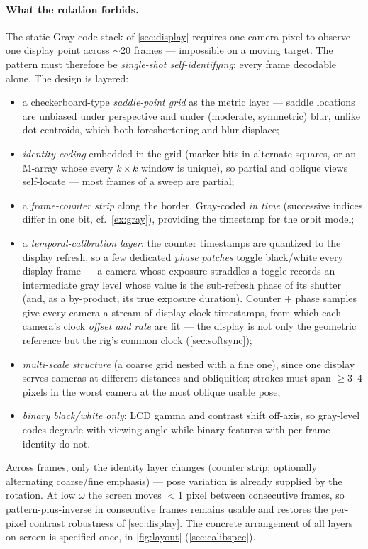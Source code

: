 \documentclass[11pt]{article}
\theoremstyle{definition}
\begin{document}
\paragraph{What the rotation forbids.} The static Gray-code stack of
\autoref{sec:display} requires one camera pixel to observe one display
point across $\sim$20 frames --- impossible on a moving target. The
pattern must therefore be \emph{single-shot self-identifying}: every frame
decodable alone. The design is layered:
\begin{itemize}
  \item a checkerboard-type \emph{saddle-point grid} as the metric layer
        --- saddle locations are unbiased under perspective and under
        (moderate, symmetric) blur, unlike dot centroids, which both
        foreshortening and blur displace;
  \item \emph{identity coding} embedded in the grid (marker bits in
        alternate squares, or an M-array whose every $k\times k$ window is
        unique), so partial and oblique views self-locate --- most frames
        of a sweep are partial;
  \item a \emph{frame-counter strip} along the border, Gray-coded
        \emph{in time} (successive indices differ in one bit,
        cf.~\autoref{ex:gray}), providing the timestamp for the orbit
        model;
  \item a \emph{temporal-calibration layer}: the counter timestamps are
        quantized to the display refresh, so a few dedicated
        \emph{phase patches} toggle black/white every display frame ---
        a camera whose exposure straddles a toggle records an
        intermediate gray level whose value is the sub-refresh phase of
        its shutter (and, as a by-product, its true exposure duration).
        Counter $+$ phase samples give every camera a stream of
        display-clock timestamps, from which each camera's clock
        \emph{offset and rate} are fit --- the display is not only the
        geometric reference but the rig's common clock
        (\autoref{sec:softsync});
  \item \emph{multi-scale structure} (a coarse grid nested with a fine
        one), since one display serves cameras at different distances and
        obliquities; strokes must span ${\ge}3$--$4$ pixels in the worst
        camera at the most oblique usable pose;
  \item \emph{binary black/white only}: LCD gamma and contrast shift
        off-axis, so gray-level codes degrade with viewing angle while
        binary features with per-frame identity do not.
\end{itemize}
Across frames, only the identity layer changes (counter strip; optionally
alternating coarse/fine emphasis) --- pose variation is already supplied by
the rotation. At low $\omega$ the screen moves ${<}1$ pixel between
consecutive frames, so pattern-plus-inverse in consecutive frames remains
usable and restores the per-pixel contrast robustness of
\autoref{sec:display}. The concrete arrangement of all layers on screen
is specified once, in \autoref{fig:layout} (\autoref{sec:calibspec}).
\end{document}
